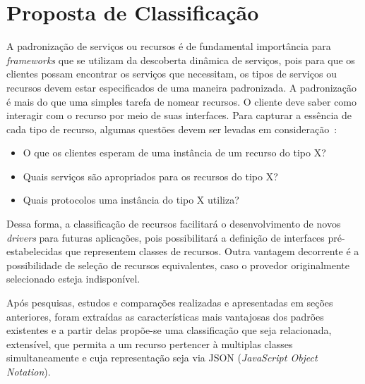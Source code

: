 \chapter{Proposta de Classificação}

A padronização de serviços ou recursos é de fundamental importância para \emph{frameworks} que se utilizam da descoberta dinâmica de serviços, pois para que os clientes possam encontrar os serviços que necessitam, os tipos de serviços ou recursos devem estar especificados de uma maneira padronizada. A padronização é mais do que uma simples tarefa de nomear recursos. O cliente deve saber como interagir com o recurso por meio de suas interfaces. Para capturar a essência de cada tipo de recurso, algumas questões devem ser levadas em consideração~\cite{pervasiveComputing}:

\begin{itemize}
	\item O que os clientes esperam de uma instância de um recurso do tipo X?

	\item Quais serviços são apropriados para os recursos do tipo X?

	\item Quais protocolos uma instância do tipo X utiliza?
\end{itemize}

Dessa forma, a classificação de recursos facilitará o desenvolvimento de novos \emph{drivers} para futuras aplicações, pois possibilitará a definição de interfaces pré-estabelecidas que representem classes de recursos. Outra vantagem decorrente é a possibilidade de seleção de recursos equivalentes, caso o provedor originalmente selecionado esteja indisponível.

Após pesquisas, estudos e comparações realizadas e apresentadas em seções anteriores, foram extraídas as características mais vantajosas dos padrões existentes e a partir delas propõe-se uma classificação que seja relacionada, extensível, que permita a um recurso pertencer à multiplas classes simultaneamente e cuja representação seja via JSON (\emph{JavaScript Object Notation}).

